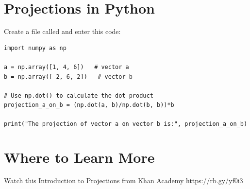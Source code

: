 \section{Projections in Python}

Create a file called  and enter this code:
\begin{Verbatim}
import numpy as np
  
a = np.array([1, 4, 6])   # vector a
b = np.array([-2, 6, 2])   # vector b
  
# Use np.dot() to calculate the dot product
projection_a_on_b = (np.dot(a, b)/np.dot(b, b))*b
  
print("The projection of vector a on vector b is:", projection_a_on_b)
\end{Verbatim}
 
\section{Where to Learn More}

Watch this Introduction to Projections from Khan Academy 
https://rb.gy/yf0i3


